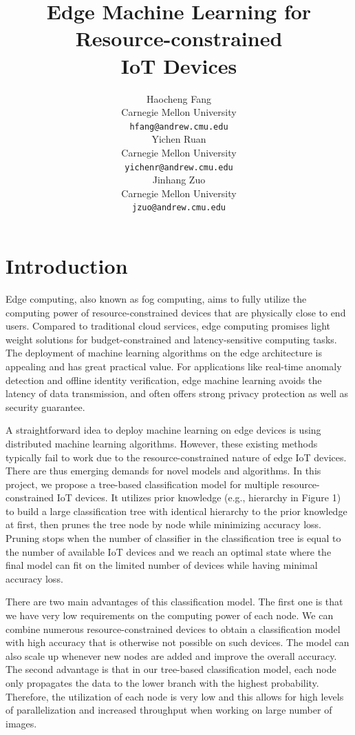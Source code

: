 \documentclass{article}
\title{Edge Machine Learning for Resource-constrained\\IoT Devices}
\author{
  Haocheng Fang \\
  Carnegie Mellon University \\
  \texttt{hfang@andrew.cmu.edu} \\
  \And
  Yichen Ruan \\
  Carnegie Mellon University \\
  \texttt{yichenr@andrew.cmu.edu} \\
  \And
  Jinhang Zuo \\
  Carnegie Mellon University \\
  \texttt{jzuo@andrew.cmu.edu} \\
}
\begin{document}

\maketitle
\section{Introduction}


Edge computing, also known as fog computing, aims to fully utilize the computing power of resource-constrained devices that are physically close to end users. Compared to traditional cloud services, edge computing promises light weight solutions for budget-constrained and latency-sensitive computing tasks. The deployment of machine learning algorithms on the edge architecture is appealing and has great practical value. For applications like real-time anomaly detection and offline identity verification, edge machine learning avoids the latency of data transmission, and often offers strong privacy protection as well as security guarantee.

A straightforward idea to deploy machine learning on edge devices is using distributed machine learning algorithms. However, these existing methods typically fail to work due to the resource-constrained nature of edge IoT devices. There are thus emerging demands for novel models and algorithms. In this project, we propose a tree-based classification model for multiple resource-constrained IoT devices. It utilizes prior knowledge (e.g., hierarchy in Figure 1) to build a large classification tree with identical hierarchy to the prior knowledge at first, then prunes the tree node by node while minimizing accuracy loss. Pruning stops when the number of classifier in the classification tree is equal to the number of available IoT devices and we reach an optimal state where the final model can fit on the limited number of devices while having minimal accuracy loss.

There are two main advantages of this classification model. The first one is that we have very low requirements on the computing power of each node. We can combine numerous resource-constrained devices to obtain a classification model with high accuracy that is otherwise not possible on such devices. The model can also scale up whenever new nodes are added and improve the overall accuracy. The second advantage is that in our tree-based classification model, each node only propagates the data to the lower branch with the highest probability. Therefore, the utilization of each node is very low and this allows for high levels of parallelization and increased throughput when working on large number of images. 
\end{document}
